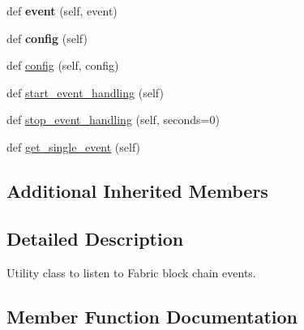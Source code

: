 \begin{DoxyCompactItemize}
def {\bfseries event} (self, event)
\item 
\mbox{\label{classavalon__sdk_1_1connector_1_1blockchains_1_1fabric_1_1event__listener_1_1EventListener_af1b77e08282cf1efd91e773fc9e345c0}} 
def {\bfseries config} (self)
\item 
def \hyperlink{classavalon__sdk_1_1connector_1_1blockchains_1_1fabric_1_1event__listener_1_1EventListener_ad99b98fca4c4f61a119b4d026c730806}{config} (self, config)
\item 
def \hyperlink{classavalon__sdk_1_1connector_1_1blockchains_1_1fabric_1_1event__listener_1_1EventListener_a9bdfb2946d41d3b353430e777ae9f17f}{start\+\_\+event\+\_\+handling} (self)
\item 
def \hyperlink{classavalon__sdk_1_1connector_1_1blockchains_1_1fabric_1_1event__listener_1_1EventListener_a5199c6a4e9a39ccbd55857bdb3dfbea1}{stop\+\_\+event\+\_\+handling} (self, seconds=0)
\item 
def \hyperlink{classavalon__sdk_1_1connector_1_1blockchains_1_1fabric_1_1event__listener_1_1EventListener_afbb9ad3af297ec4c2cb533b8a7a6ad28}{get\+\_\+single\+\_\+event} (self)
\end{DoxyCompactItemize}
\subsection*{Additional Inherited Members}


\subsection{Detailed Description}
\begin{DoxyVerb}Utility class to listen to Fabric block chain events.
\end{DoxyVerb}
 

\subsection{Member Function Documentation}
\mbox{\label{classavalon__sdk_1_1connector_1_1blockchains_1_1fabric_1_1event__listener_1_1EventListener_ad99b98fca4c4f61a119b4d026c730806}} 
